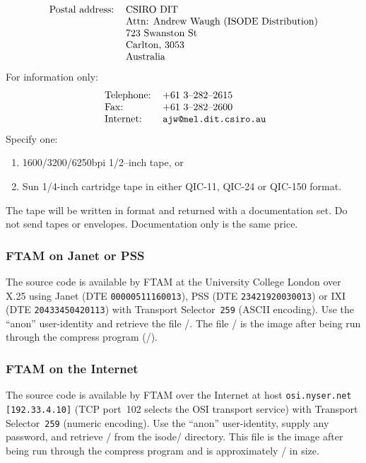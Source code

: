 \[\begin{tabular}{ll}
Postal address:&        CSIRO DIT\\
&                       Attn: Andrew Waugh (ISODE Distribution)\\
&                       723 Swanston St\\
&                       Carlton, 3053\\
&                       Australia
\end{tabular}\]
For information only:
\[\begin{tabular}{ll}
\ Telephone:&           +61 3--282--2615\\
\ Fax:&                 +61 3--282--2600\\
\ Internet:&            \verb"ajw@mel.dit.csiro.au"
\end{tabular}\]
Specify one:
\begin{enumerate}
\item   1600/3200/6250bpi 1/2--inch tape, or

\item   Sun 1/4-inch cartridge tape in either QIC-11, QIC-24 or QIC-150 format.
\end{enumerate}
The tape will be written in  format and returned with a documentation set.
Do not send tapes or envelopes.
Documentation only is the same price.

\subsubsection*{FTAM on Janet or PSS}
The source code is available by FTAM at the University College London over X.25
using Janet (DTE \verb"00000511160013"), PSS (DTE \verb"23421920030013") 
or IXI (DTE \verb"20433450420113") with
Transport Selector~\verb"259" (ASCII encoding).
Use the ``anon'' user-identity and retrieve the file \tarfile/.
The file \compressfile/ is the  image after being
run through the compress program (\compresssize/).

\subsubsection*{FTAM on the Internet}

The source code is available by FTAM over the
Internet at host \verb"osi.nyser.net" \verb"[192.33.4.10]"
(TCP port~102 selects the OSI transport service)
with Transport Selector~\verb"259" (numeric encoding).
Use the ``anon'' user-identity, supply any password,
and retrieve \compressfile/ from the isode/ directory.
This file is the  image after being run through the compress program
and is approximately \compresssize/ in size.

